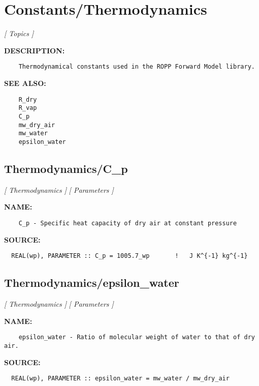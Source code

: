 \section{Constants/Thermodynamics}
\textsl{[ Topics ]}

\label{ch:robo26}
\label{ch:Constants_Thermodynamics}
\textbf{DESCRIPTION:}\hspace{0.08in}\begin{Verbatim}
    Thermodynamical constants used in the ROPP Forward Model library.
\end{Verbatim}
\textbf{SEE ALSO:}\hspace{0.08in}\begin{Verbatim}
    R_dry
    R_vap
    C_p
    mw_dry_air
    mw_water
    epsilon_water
\end{Verbatim}
\subsection{Thermodynamics/C\_p}
\textsl{[ Thermodynamics ]}
\textsl{[ Parameters ]}

\label{ch:robo81}
\label{ch:Thermodynamics_C_p}
\textbf{NAME:}\hspace{0.08in}\begin{Verbatim}
    C_p - Specific heat capacity of dry air at constant pressure
\end{Verbatim}
\textbf{SOURCE:}\hspace{0.08in}\begin{Verbatim}
  REAL(wp), PARAMETER :: C_p = 1005.7_wp       !   J K^{-1} kg^{-1}
\end{Verbatim}
\subsection{Thermodynamics/epsilon\_water}
\textsl{[ Thermodynamics ]}
\textsl{[ Parameters ]}

\label{ch:robo82}
\label{ch:Thermodynamics_epsilon_water}
\textbf{NAME:}\hspace{0.08in}\begin{Verbatim}
    epsilon_water - Ratio of molecular weight of water to that of dry air.
\end{Verbatim}
\textbf{SOURCE:}\hspace{0.08in}\begin{Verbatim}
  REAL(wp), PARAMETER :: epsilon_water = mw_water / mw_dry_air
\end{Verbatim}
